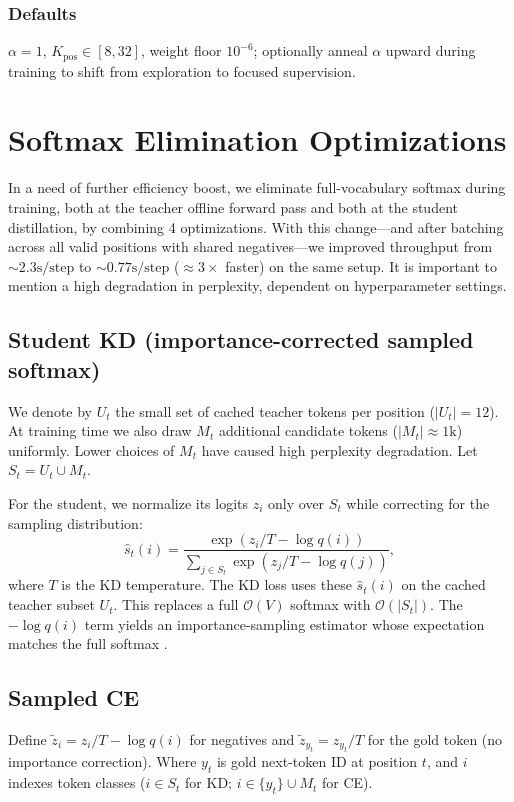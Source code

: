 \documentclass[11pt]{article}
\begin{document}
\subsubsection{Defaults}
$\alpha{=}1$, $K_{\text{pos}}\!\in\![8,32]$, weight floor $10^{-6}$; optionally anneal $\alpha$ upward during training to shift from exploration to focused supervision.

\section{Softmax Elimination Optimizations}
\label{sec:softmax_elimination}
In a need of further efficiency boost, we eliminate full-vocabulary softmax during training, both at the teacher offline forward pass and both at the student distillation, by combining 4 optimizations.
With this change---and after batching across all valid positions with shared negatives---we improved throughput from ${\sim}2.3\text{s}/\text{step}$ to ${\sim}0.77\text{s}/\text{step}$ ($\approx3\times$ faster) on the same setup.
It is important to mention a high degradation in perplexity, dependent on hyperparameter settings.

\subsection{Student KD (importance-corrected sampled softmax)}
\label{sec:sampled_softmax}
We denote by $U_t$ the small set of cached teacher tokens per position ($|U_t|=12$).
At training time we also draw $M_t$ additional candidate tokens ($|M_t| \approx 1\text{k}$) uniformly.
Lower choices of $M_t$ have caused high perplexity degradation.
Let $S_t = U_t \cup M_t$.

For the student, we normalize its logits $z_i$ only over $S_t$ while correcting for the sampling distribution:
\[
	\hat s_t(i) = \frac{\exp(z_i/T - \log q(i))}{\sum_{j \in S_t} \exp(z_j/T - \log q(j))},
\]
where $T$ is the KD temperature.
The KD loss uses these $\hat s_t(i)$ on the cached teacher subset $U_t$. This replaces a full $\mathcal{O}(V)$ softmax with $\mathcal{O}(|S_t|)$.
The $-\log q(i)$ term yields an importance-sampling estimator whose expectation matches the full softmax \citep{jean2015large}.

\subsection{Sampled CE}
Define $\tilde z_i = z_i/T - \log q(i)$ for negatives and $\tilde z_{y_t}=z_{y_t}/T$ for the gold token (no importance correction).
Where $y_t$ is gold next-token ID at position $t$, and $i$ indexes token classes ($i\in S_t$ for KD; $i\in\{y_t\}\cup M_t$ for CE).
\end{document}
